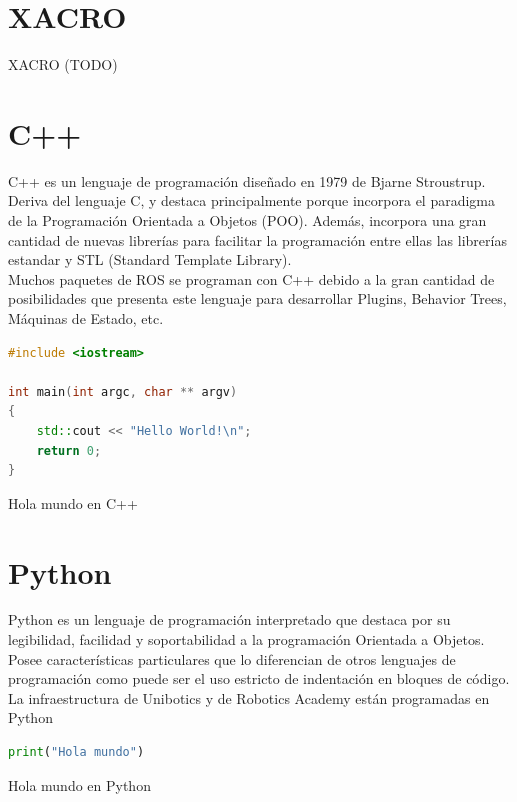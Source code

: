 \section{XACRO}
\label{sec:xacro}

XACRO (TODO)

\section{C++}
\label{sec:c++}

C++ es un lenguaje de programación diseñado en 1979 de Bjarne Stroustrup. Deriva del lenguaje C, y destaca principalmente porque incorpora el paradigma de la Programación Orientada a Objetos (POO). Además, incorpora una gran cantidad de nuevas librerías para facilitar la programación entre ellas las librerías estandar y STL (Standard Template Library).\\

Muchos paquetes de ROS se programan con C++ debido a la gran cantidad de posibilidades que presenta este lenguaje para desarrollar Plugins, Behavior Trees, Máquinas de Estado, etc.\\

\begin{code}[h]
\begin{lstlisting}[language=C++]
#include <iostream>

int main(int argc, char ** argv)
{
	std::cout << "Hello World!\n";
	return 0;
}
\end{lstlisting}
\caption[Hola mundo en C++]{Hola mundo en C++}
\label{cod:holamundo_cplusplus}
\end{code}


\section{Python}
\label{sec:python}

Python es un lenguaje de programación interpretado que destaca por su legibilidad, facilidad y soportabilidad a la programación Orientada a Objetos. Posee características particulares que lo diferencian de otros lenguajes de programación como puede ser el uso estricto de indentación en bloques de código.\\

La infraestructura de Unibotics y de Robotics Academy están programadas en Python

\begin{code}[h]
\begin{lstlisting}[language=Python]
print("Hola mundo")
\end{lstlisting}
\caption[Hola mundo en Python]{Hola mundo en Python}
\label{cod:holamundo_python}
\end{code}

